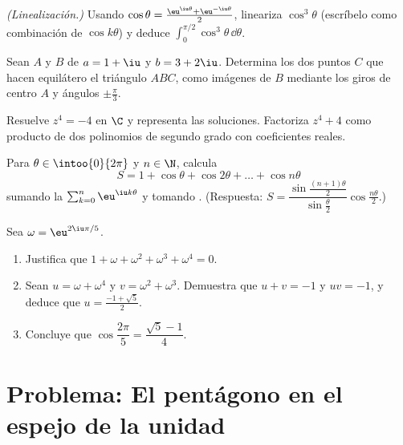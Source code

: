\begin{exercise}[$\star\star$]\label{exo:g12:complex:6}
\emph{(Linealización.)} Usando
$\cos\theta = \frac{\eu^{\iu\theta} + \eu^{-\iu\theta}}{2}$, lineariza
$\cos^3\theta$ (escríbelo como combinación de $\cos k\theta$) y deduce
$\displaystyle\int_0^{\pi/2}\cos^3\theta\,\dd\theta$.
\end{exercise}

\begin{exercise}[$\star\star$]\label{exo:g12:complex:7}
Sean $A$ y $B$ de  $a = 1 + \iu$ y $b = 3 + 2\iu$. Determina los dos
puntos $C$ que hacen equilátero el triángulo $ABC$, como imágenes de $B$
mediante los giros de centro $A$ y ángulos $\pm\frac{\pi}{3}$.
\end{exercise}

\begin{exercise}[$\star\star\star$]\label{exo:g12:complex:8}
Resuelve $z^4 = -4$ en $\C$ y representa las soluciones. Factoriza
$z^4 + 4$ como producto de dos polinomios de segundo grado con coeficientes
reales.
\end{exercise}

\begin{exercise}[$\star\star\star$]\label{exo:g12:complex:9}
Para $\theta \in \intoo{0}{2\pi}$ y $n \in \N$, calcula
\[
S = 1 + \cos\theta + \cos 2\theta + \dots + \cos n\theta
\]
sumando la  $\sum_{k=0}^n \eu^{\iu k\theta}$ y tomando
. (Respuesta:
$S = \dfrac{\sin\frac{(n+1)\theta}{2}}{\sin\frac{\theta}{2}}
\cos\frac{n\theta}{2}$.)
\end{exercise}

\begin{exercise}[$\star\star\star$]\label{exo:g12:complex:10}
Sea $\omega = \eu^{2\iu\pi/5}$.
\begin{enumerate}
  \item Justifica que $1 + \omega + \omega^2 + \omega^3 + \omega^4 = 0$.
  \item Sean $u = \omega + \omega^4$ y $v = \omega^2 + \omega^3$. Demuestra
        que $u + v = -1$ y $uv = -1$, y deduce que
        $u = \frac{-1+\sqrt5}{2}$.
  \item Concluye que $\cos\dfrac{2\pi}{5} = \dfrac{\sqrt5 - 1}{4}$.
\end{enumerate}
\end{exercise}

\section{Problema: El pentágono en el espejo de la unidad}

